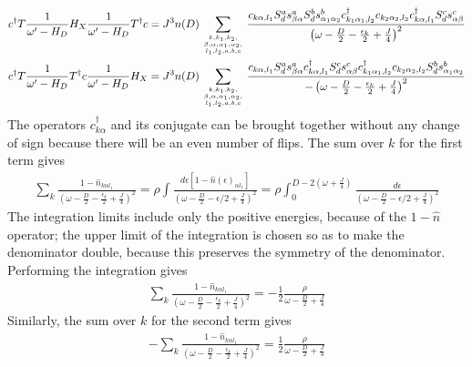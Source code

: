\documentclass[12pt]{revtex4-2}
\begin{document}
\begin{align}
	c^\dagger T \frac{1}{\omega^\prime - H_D} H_X \frac{1}{\omega^\prime - H_D} T^\dagger c = J^3 n(D)\sum_{k, k_1,k_2,\atop{\beta, \alpha, \alpha_1,\alpha_2,\atop{l_1,l_2,a,b,c}}} \frac{c_{k\alpha,l_1} S_d^a s^a_{\beta \alpha} S_d^b s^b_{\alpha_1 \alpha_2} c^\dagger_{k_1\alpha_1,l_2}c_{k_2 \alpha_2,l_2} c^\dagger_{k\alpha, l_1} S_d^c s^c_{\alpha \beta}}{\left(\omega - \frac{D}{2} - \frac{\epsilon_k}{2} + \frac{J}{4}\right)^2}\\
	c^\dagger T \frac{1}{\omega^\prime - H_D} T^\dagger c \frac{1}{\omega^\prime - H_D} H_X = J^3 n(D) \sum_{k, k_1,k_2,\atop{\beta, \alpha, \alpha_1,\alpha_2,\atop{l_1,l_2,a,b,c}}} \frac{c_{k\alpha,l_1} S_d^a s^a_{\beta \alpha} c^\dagger_{k\alpha, l_1} S_d^c s^c_{\alpha \beta} c^\dagger_{k_1\alpha_1,l_2}c_{k_2 \alpha_2,l_2} S_d^b s^b_{\alpha_1 \alpha_2}}{-\left(\omega - \frac{D}{2} - \frac{\epsilon_k}{2} + \frac{J}{4}\right)^2}
\end{align}
The operators \(c^\dagger_{k\alpha}\) and its conjugate can be brought together without any change of sign because there will be an even number of flips. The sum over \(k\) for the first term gives
\begin{align}
	\sum_k \frac{1 - \hat n_{k\alpha l_1}}{\left(\omega - \frac{D}{2} - \frac{\epsilon_k}{2} + \frac{J}{4}\right)^2} =  \rho\int \frac{d\epsilon\left[1 - \hat n(\epsilon)_{\alpha l_1}\right] }{\left(\omega - \frac{D}{2} -\epsilon/2 + \frac{J}{4}\right)^2} = \rho\int_0^{D-2\left( \omega + \frac{J}{4} \right) } \frac{d\epsilon}{\left(\omega - \frac{D}{2} -\epsilon/2 + \frac{J}{4}\right)^2}
\end{align}
The integration limits include only the positive energies, because of the \(1 - \hat n\) operator; the upper limit of the integration is chosen so as to make the denominator double, because this preserves the symmetry of the denominator. Performing the integration gives
\begin{align}
	\sum_k \frac{1 - \hat n_{k\alpha l_1}}{\left(\omega - \frac{D}{2} - \frac{\epsilon_k}{2} + \frac{J}{4}\right)^2} = -\frac{1}{2}\frac{\rho}{\omega - \frac{D}{2} + \frac{J}{4}}
\end{align}
Similarly, the sum over \(k\) for the second term gives
\begin{align}
	\label{term2_sum}
	-\sum_k \frac{1 - \hat n_{k\alpha l_1}}{\left(\omega - \frac{D}{2} - \frac{\epsilon_k}{2} + \frac{J}{4}\right)^2} = \frac{1}{2}\frac{\rho}{\omega - \frac{D}{2} + \frac{J}{4}}
\end{align}
\end{document}
